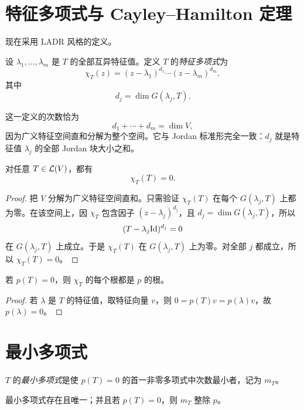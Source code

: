 \section{特征多项式与 Cayley--Hamilton 定理}

现在采用 LADR 风格的定义。

\begin{definition}
设 $\lambda_1,\dots,\lambda_m$ 是 $T$ 的全部互异特征值。定义 $T$ 的\emph{特征多项式}为
\[
\chi_T(z)=(z-\lambda_1)^{d_1}\cdots(z-\lambda_m)^{d_m},
\]
其中
\[
d_j=\dim G(\lambda_j,T).
\]
\end{definition}

这一定义的次数恰为
\[
d_1+\cdots+d_m=\dim V,
\]
因为广义特征空间直和分解为整个空间。它与 Jordan 标准形完全一致：$d_j$ 就是特征值 $\lambda_j$ 的全部 Jordan 块大小之和。

\begin{theorem}
对任意 $T\in\mathcal{L}(V)$，都有
\[
\chi_T(T)=0.
\]
\end{theorem}

\begin{proof}
把 $V$ 分解为广义特征空间直和。只需验证 $\chi_T(T)$ 在每个 $G(\lambda_j,T)$ 上都为零。在该空间上，因 $\chi_T$ 包含因子 $(z-\lambda_j)^{d_j}$，且 $d_j=\dim G(\lambda_j,T)$，所以
\[
(T-\lambda_j\mathrm{Id})^{d_j}=0
\]
在 $G(\lambda_j,T)$ 上成立。于是 $\chi_T(T)$ 在 $G(\lambda_j,T)$ 上为零。对全部 $j$ 都成立，所以 $\chi_T(T)=0$。
\end{proof}

\begin{corollary}
若 $p(T)=0$，则 $\chi_T$ 的每个根都是 $p$ 的根。
\end{corollary}

\begin{proof}
若 $\lambda$ 是 $T$ 的特征值，取特征向量 $v$，则 $0=p(T)v=p(\lambda)v$，故 $p(\lambda)=0$。
\end{proof}

\section{最小多项式}

\begin{definition}
$T$ 的\emph{最小多项式}是使 $p(T)=0$ 的首一非零多项式中次数最小者，记为 $m_T$。
\end{definition}

\begin{proposition}
最小多项式存在且唯一；并且若 $p(T)=0$，则 $m_T$ 整除 $p$。
\end{proposition}

